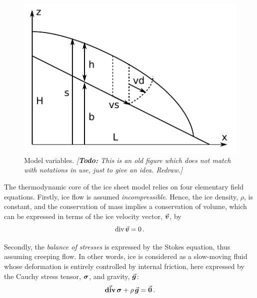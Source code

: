 \documentclass{article}
\newcommand{\todo}[1]{\emph{[\textbf{Todo:} #1]}}
\newcommand{\vect}[1]{\va*{#1}} %
\newcommand{\tens}[1]{\vb*{#1}} %
\renewcommand{\div}[1]{\mathrm{div}\,#1}            %
\newcommand{\tdiv}[1]{\vect{\mathrm{div}}\,#1}      %
\newcommand{\CST}[0]{\tens{\sigma}}     %
\newcommand{\vv}[0]{\vect{v}}           %
\begin{document}
\begin{figure}
  \centering
  \includegraphics{model-variables}
  \caption{Model variables. \todo{This is an old figure which does not match
           with notations in use, just to give an idea. Redraw.}}
  \label{fig:model-variables}
\end{figure}

The thermodynamic core of the ice sheet model relies on four elementary field
equations. Firstly, ice flow is assumed \emph{incompressible}. Hence, the ice
density, $\rho$, is constant, and the
conservation of mass implies a conservation of volume, which can be expressed
in terms of the ice velocity vector, $\vv$, by
\begin{equation}
    \label{eqn:incompressibility}
    \div{\vv} = 0 \,.
\end{equation}

Secondly, the \emph{balance of stresses} is expressed by the Stokes equation,
thus assuming creeping flow. In other words, ice is considered as a slow-moving
fluid whose deformation is entirely controlled by internal friction, here
expressed by the Cauchy stress tensor, $\CST$, and gravity, $\vect{g}$:
\begin{equation}
    \label{eqn:stressbalance}
    \tdiv{\CST} + \rho\,\vect{g} = \vect{0} \,.
\end{equation}
\end{document}
